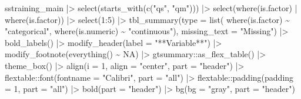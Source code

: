 \documentclass[
  letterpaper,
  DIV=11,
  numbers=noendperiod]{scrreprt}
\newenvironment{Shaded}{\begin{snugshade}}{\end{snugshade}}
\newcommand{\AttributeTok}[1]{\textcolor[rgb]{0.40,0.45,0.13}{#1}}
\newcommand{\ConstantTok}[1]{\textcolor[rgb]{0.56,0.35,0.01}{#1}}
\newcommand{\DecValTok}[1]{\textcolor[rgb]{0.68,0.00,0.00}{#1}}
\newcommand{\FunctionTok}[1]{\textcolor[rgb]{0.28,0.35,0.67}{#1}}
\newcommand{\NormalTok}[1]{\textcolor[rgb]{0.00,0.23,0.31}{#1}}
\newcommand{\SpecialCharTok}[1]{\textcolor[rgb]{0.37,0.37,0.37}{#1}}
\newcommand{\StringTok}[1]{\textcolor[rgb]{0.13,0.47,0.30}{#1}}
\begin{document}
\begin{Shaded}
\begin{Highlighting}[]
\NormalTok{sstraining\_main }\SpecialCharTok{|\textgreater{}} 
  \FunctionTok{select}\NormalTok{(}\FunctionTok{starts\_with}\NormalTok{(}\FunctionTok{c}\NormalTok{(}\StringTok{"qs"}\NormalTok{, }\StringTok{"qm"}\NormalTok{))) }\SpecialCharTok{|\textgreater{}} 
  \FunctionTok{select}\NormalTok{(}\FunctionTok{where}\NormalTok{(is.factor) }\SpecialCharTok{|} \FunctionTok{where}\NormalTok{(is.factor)) }\SpecialCharTok{|\textgreater{}} 
  \FunctionTok{select}\NormalTok{(}\DecValTok{1}\SpecialCharTok{:}\DecValTok{5}\NormalTok{) }\SpecialCharTok{|\textgreater{}} 
  \FunctionTok{tbl\_summary}\NormalTok{(}\AttributeTok{type =} \FunctionTok{list}\NormalTok{(}
                \FunctionTok{where}\NormalTok{(is.factor) }\SpecialCharTok{\textasciitilde{}} \StringTok{"categorical"}\NormalTok{,}
                \FunctionTok{where}\NormalTok{(is.numeric) }\SpecialCharTok{\textasciitilde{}} \StringTok{"continuous"}\NormalTok{), }\AttributeTok{missing\_text =}  \StringTok{"Missing"}\NormalTok{) }\SpecialCharTok{|\textgreater{}} 
  \FunctionTok{bold\_labels}\NormalTok{() }\SpecialCharTok{|\textgreater{}} 
  \FunctionTok{modify\_header}\NormalTok{(}\AttributeTok{label =} \StringTok{"**Variable**"}\NormalTok{) }\SpecialCharTok{|\textgreater{}} 
  \FunctionTok{modify\_footnote}\NormalTok{(}\FunctionTok{everything}\NormalTok{() }\SpecialCharTok{\textasciitilde{}} \ConstantTok{NA}\NormalTok{) }\SpecialCharTok{|\textgreater{}} 
\NormalTok{  gtsummary}\SpecialCharTok{::}\FunctionTok{as\_flex\_table}\NormalTok{() }\SpecialCharTok{|\textgreater{}}
  \FunctionTok{theme\_box}\NormalTok{() }\SpecialCharTok{|\textgreater{}} 
  \FunctionTok{align}\NormalTok{(}\AttributeTok{i =} \DecValTok{1}\NormalTok{, }\AttributeTok{align =} \StringTok{"center"}\NormalTok{, }\AttributeTok{part =} \StringTok{"header"}\NormalTok{) }\SpecialCharTok{|\textgreater{}} 
\NormalTok{  flextable}\SpecialCharTok{::}\FunctionTok{font}\NormalTok{(}\AttributeTok{fontname =} \StringTok{"Calibri"}\NormalTok{, }\AttributeTok{part =} \StringTok{"all"}\NormalTok{) }\SpecialCharTok{|\textgreater{}} 
\NormalTok{  flextable}\SpecialCharTok{::}\FunctionTok{padding}\NormalTok{(}\AttributeTok{padding =} \DecValTok{1}\NormalTok{, }\AttributeTok{part =} \StringTok{"all"}\NormalTok{) }\SpecialCharTok{|\textgreater{}} 
  \FunctionTok{bold}\NormalTok{(}\AttributeTok{part =} \StringTok{"header"}\NormalTok{) }\SpecialCharTok{|\textgreater{}} 
  \FunctionTok{bg}\NormalTok{(}\AttributeTok{bg =} \StringTok{"gray"}\NormalTok{, }\AttributeTok{part =} \StringTok{"header"}\NormalTok{)}
\end{Highlighting}
\end{Shaded}
\end{document}
